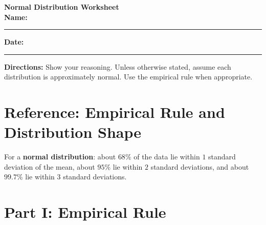 \documentclass[11pt]{article}
\newcommand{\blank}[1]{\rule{#1}{0.4pt}}
\begin{document}
\begin{center}
    {\LARGE \textbf{Normal Distribution Worksheet}}\\[0.5em]
    \textbf{Name:} \blank{2.5in} \hfill \textbf{Date:} \blank{1.5in}
\end{center}

\vspace{0.5em}

\textbf{Directions:} Show your reasoning. Unless otherwise stated, assume each distribution is approximately normal. Use the empirical rule when appropriate.

\section{Reference: Empirical Rule and Distribution Shape}

\begin{center}
\end{center}

For a \textbf{normal distribution}: about $68\%$ of the data lie within $1$ standard deviation of the mean, about $95\%$ lie within $2$ standard deviations, and about $99.7\%$ lie within $3$ standard deviations.

\section{Part I: Empirical Rule}
\end{document}
